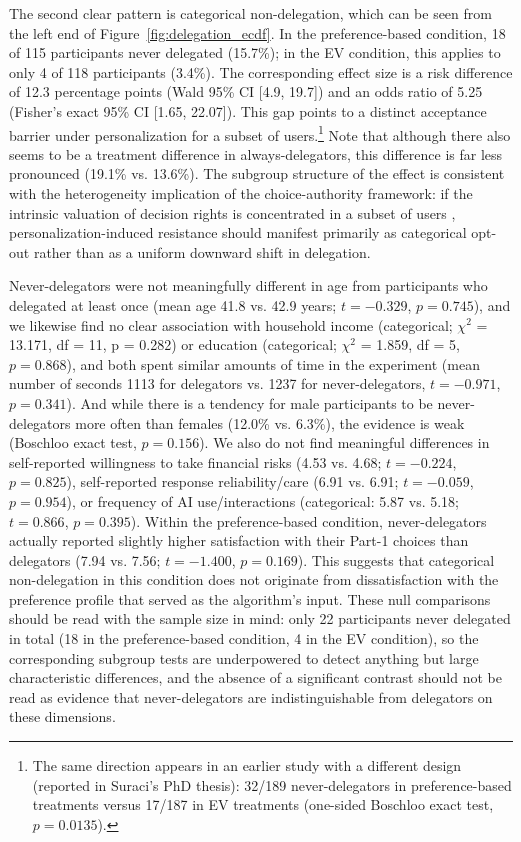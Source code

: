 \documentclass[a4paper, 12pt, fleqn]{article}
\theoremstyle{definition}
\newcommand{\inew}[1]{{\color{blue} #1\color{black}}}
\begin{document}
The second clear pattern is categorical non-delegation, which can be seen from the left end of Figure~\ref{fig:delegation_ecdf}. In the preference-based condition, 18 of 115 participants never delegated (15.7\%); in the EV condition, this applies to only 4 of 118 participants (3.4\%). \inew{The corresponding effect size is a risk difference of 12.3 percentage points (Wald 95\% CI [4.9, 19.7]) and an odds ratio of 5.25 (Fisher's exact 95\% CI [1.65, 22.07]).} This gap points to a distinct acceptance barrier under personalization for a subset of users.\footnote{The same direction appears in an earlier study with a different design (reported in Suraci's PhD thesis): 32/189 never-delegators in preference-based treatments versus 17/187 in EV treatments (one-sided Boschloo exact test, $p = 0.0135$).} Note that although there also seems to be a treatment difference in always-delegators, this difference is far less pronounced (19.1\% vs. 13.6\%). The subgroup structure of the effect is consistent with the heterogeneity implication of the choice-authority framework: if the intrinsic valuation of decision rights is concentrated in a subset of users \citep{Bartling2014,Owens2014}, personalization-induced resistance should manifest primarily as categorical opt-out rather than as a uniform downward shift in delegation.

Never-delegators were not meaningfully different in age from participants who delegated at least once (mean age 41.8 vs. 42.9 years; $t = -0.329$, $p = 0.745$), and we likewise find no clear association with household income (categorical; \(\chi^2\) = 13.171, df = 11, p = 0.282) or education (categorical; \(\chi^2\) = 1.859, df = 5, $p = 0.868$), and both spent similar amounts of time in the experiment (mean number of seconds 1113 for delegators vs. 1237 for never-delegators, $t = -0.971$, $p = 0.341$). And while there is a tendency for male participants to be never-delegators more often than females (12.0\% vs. 6.3\%), the evidence is weak (Boschloo exact test, $p = 0.156$). We also do not find meaningful differences in self-reported willingness to take financial risks (4.53 vs. 4.68; $t = -0.224$, $p = 0.825$), self-reported response reliability/care (6.91 vs. 6.91; $t = -0.059$, $p = 0.954$), or frequency of AI use/interactions (categorical: 5.87 vs. 5.18; $t = 0.866$, $p = 0.395$).
Within the preference-based condition, never-delegators actually reported slightly higher satisfaction with their Part-1 choices than delegators (7.94 vs. 7.56; $t = -1.400$, $p = 0.169$). This suggests that categorical non-delegation in this condition does not originate from dissatisfaction with the preference profile that served as the algorithm's input. \inew{These null comparisons should be read with the sample size in mind: only 22 participants never delegated in total (18 in the preference-based condition, 4 in the EV condition), so the corresponding subgroup tests are underpowered to detect anything but large characteristic differences, and the absence of a significant contrast should not be read as evidence that never-delegators are indistinguishable from delegators on these dimensions.}
\end{document}
